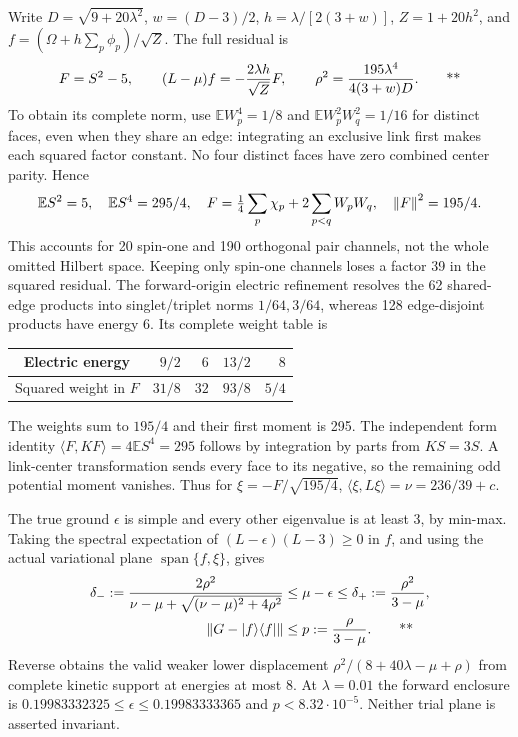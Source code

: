 Write $D=\sqrt{9+20\lambda^2}$, $w=(D-3)/2$,
$h=\lambda/[2(3+w)]$, $Z=1+20h^2$, and
$f=(\Omega+h\sum_p\phi_p)/\sqrt Z$.  The full residual is
\begin{equation}
 F=S^2-5,\qquad (L-\mu)f=-\frac{2\lambda h}{\sqrt Z}F,
 \qquad \rho^2=\frac{195\lambda^4}{4(3+w)D}.\qquad\text{**}
 \label{recent:residual21}
\end{equation}
To obtain its complete norm, use
$\mathbb E W_p^4=1/8$ and
$\mathbb E W_p^2W_q^2=1/16$ for distinct faces, even when they share an edge:
integrating an exclusive link first makes each squared factor constant.
No four distinct faces have zero combined center parity.  Hence
\begin{equation}
 \mathbb E S^2=5,\quad \mathbb E S^4=295/4,\quad
 F=\tfrac14\sum_p\chi_p+2\sum_{p<q}W_pW_q,\quad
 \left\lVert F\right\rVert^2=195/4.
 \label{recent:haar-residual}
\end{equation}
This accounts for 20 spin-one and 190 orthogonal pair channels, not the whole
omitted Hilbert space.  Keeping only spin-one channels loses a factor 39 in the
squared residual.  The forward-origin electric refinement resolves the 62
shared-edge products into singlet/triplet norms $1/64,3/64$, whereas 128
edge-disjoint products have energy 6.  Its complete weight table is
\begin{center}
\begin{tabular}{c|rrrr}
Electric energy & $9/2$ & $6$ & $13/2$ & $8$\\\hline
Squared weight in $F$ & $31/8$ & $32$ & $93/8$ & $5/4$
\end{tabular}
\end{center}
The weights sum to $195/4$ and their first moment is 295.  The independent
form identity $\langle F,KF\rangle=4\mathbb E S^4=295$ follows by integration
by parts from $KS=3S$.  A link-center transformation sends every face to its
negative, so the remaining odd potential moment vanishes.  Thus for
$\xi=-F/\sqrt{195/4}$, $\langle\xi,L\xi\rangle=\nu=236/39+c$.

The true ground $\epsilon$ is simple and every other eigenvalue is at least
3, by min-max.  Taking the spectral expectation of
$(L-\epsilon)(L-3)\ge0$ in $f$, and using the actual variational plane
$\operatorname{span}\{f,\xi\}$, gives
\begin{align}
 \delta_-:=\frac{2\rho^2}{\nu-\mu+\sqrt{(\nu-\mu)^2+4\rho^2}}
 &\le\mu-\epsilon\le\delta_+:=\frac{\rho^2}{3-\mu},\notag\\
 \left\lVert G-|f\rangle\langle f|\right\rVert&\le p:=\frac\rho{3-\mu}.
 \qquad\text{**}
 \label{recent:temple21}
\end{align}
Reverse obtains the valid weaker lower displacement
$\rho^2/(8+40\lambda-\mu+\rho)$ from complete kinetic support at energies at
most 8.  At $\lambda=0.01$ the forward enclosure is
$0.19983332325\le\epsilon\le0.19983333365$ and $p<8.32\cdot10^{-5}$.
Neither trial plane is asserted invariant.

